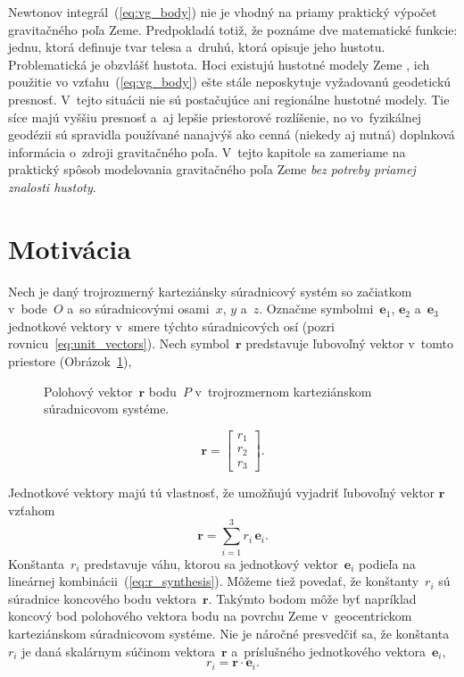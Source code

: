 \documentclass[a4paper, 12pt]{book}
\let\vec\mathbf
\begin{document}
Newtonov integrál~(\ref{eq:vg_body}) nie je vhodný na priamy praktický výpočet 
gravitačného poľa Zeme.  Predpokladá totiž, že poznáme dve matematické funkcie: 
jednu, ktorá definuje tvar telesa a~druhú, ktorá opisuje jeho hustotu.  
Problematická je obzvlášť hustota.  Hoci existujú hustotné modely Zeme 
\parencite[napríklad][]{Dziewonski1981}, ich použitie vo 
vzťahu~(\ref{eq:vg_body}) ešte stále neposkytuje vyžadovanú geodetickú 
presnosť.  V~tejto situácii nie sú postačujúce ani regionálne hustotné modely.  
Tie síce majú vyššiu presnosť a~aj lepšie priestorové rozlíšenie, no 
vo~fyzikálnej geodézii sú spravidla používané nanajvýš ako cenná (niekedy aj 
nutná) doplnková informácia o~zdroji gravitačného poľa.  V~tejto kapitole sa 
zameriame na praktický spôsob modelovania gravitačného poľa Zeme \emph{bez 
potreby priamej znalosti hustoty}.






\section{Motivácia}
\label{sec:sh_motivation}

Nech je daný trojrozmerný karteziánsky súradnicový systém so začiatkom 
v~bode~$O$ a~so súradnicovými osami~$x$, $y$ a~$z$.  Označme symbolmi~$\vec 
e_1$, $\vec e_2$ a~$\vec e_3$ jednotkové vektory v~smere týchto súradnicových 
osí (pozri rovnicu~\ref{eq:unit_vectors}).  Nech symbol~$\vec r$ predstavuje 
ľubovoľný vektor v~tomto priestore (Obrázok~\ref{fig:unit_vectors}),
%
\begin{figure}
\centering

\caption{Polohový vektor~$\vec r$ bodu~$P$ v~trojrozmernom karteziánskom 
súradnicovom systéme.}
\label{fig:unit_vectors}
\end{figure}

\begin{equation}
\vec r =
\begin{bmatrix}
r_1\\
r_2\\
r_3
\end{bmatrix}
{.}
\end{equation}

Jednotkové vektory majú tú vlastnosť, že umožňujú vyjadriť ľubovoľný vektor
$\vec r$ vzťahom
%
\begin{equation}
\label{eq:r_synthesis}
\vec r = \sum_{i = 1}^3 r_i \, \vec e_i{.}
\end{equation}
%
Konštanta~$r_i$ predstavuje váhu, ktorou sa jednotkový vektor~$\vec e_i$ 
podieľa na lineárnej kombinácii~(\ref{eq:r_synthesis}).  Môžeme tiež povedať, 
že konštanty~$r_i$ sú súradnice koncového bodu vektora~$\vec r$.  Takýmto bodom 
môže byť napríklad koncový bod polohového vektora bodu na povrchu Zeme 
v~geocentrickom karteziánskom súradnicovom systéme.  Nie je náročné presvedčiť 
sa, že konštanta~$r_i$ je daná skalárnym súčinom vektora~$\vec r$ a~príslušného 
jednotkového vektora~$\vec e_i$,
%
\begin{equation}
\label{eq:r_analysis}
r_i = \vec r \cdot \vec e_i{.}
\end{equation}
\end{document}
